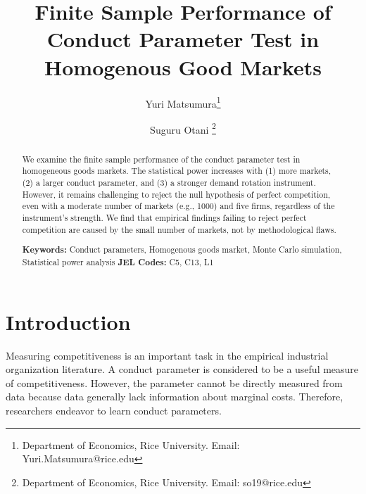 \documentclass[11pt, a4paper]{article}
\title{Finite Sample Performance of Conduct Parameter Test in Homogenous Good Markets}
\author{Yuri Matsumura\thanks{Department of Economics, Rice University. Email: Yuri.Matsumura@rice.edu} \and Suguru Otani \thanks{Department of Economics, Rice University. Email: so19@rice.edu
}}
\begin{document}
\maketitle
\begin{abstract}
    We examine the finite sample performance of the conduct parameter test in homogeneous goods markets. The statistical power increases with (1) more markets, (2) a larger conduct parameter, and (3) a stronger demand rotation instrument. However, it remains challenging to reject the null hypothesis of perfect competition, even with a moderate number of markets (e.g., 1000) and five firms, regardless of the instrument's strength. We find that empirical findings failing to reject perfect competition are caused by the small number of markets, not by methodological flaws.
\vspace{0.1in}

\noindent\textbf{Keywords:} Conduct parameters, Homogenous goods market, Monte Carlo simulation, Statistical power analysis
\vspace{0in}
\newline
\noindent\textbf{JEL Codes:} C5, C13, L1

\bigskip
\end{abstract}


\section{Introduction}
Measuring competitiveness is an important task in the empirical industrial organization literature.
A conduct parameter is considered to be a useful measure of competitiveness. 
However, the parameter cannot be directly measured from data because data generally lack information about marginal costs.
Therefore, researchers endeavor to learn conduct parameters.
\end{document}
